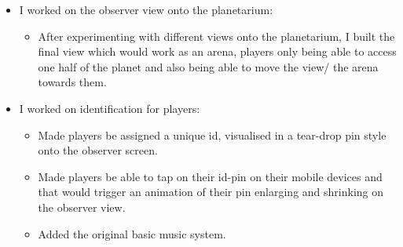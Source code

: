 \documentclass[11pt,a4paper]{article}
\begin{document}
\begin{itemize}
\begin{itemize}
          \end{itemize}
          \item I worked on the observer view onto the planetarium:
          \begin{itemize}
            \item After experimenting with different views onto the planetarium, I built the final view which would work as an arena, players only being able to access one half of the planet and also being able to move the view/ the arena towards them.
          \end{itemize}
          \item I worked on identification for players:
          \begin{itemize}
          \item Made players be assigned a unique id, visualised in a tear-drop pin style onto the observer screen.
          \item Made players be able to tap on their id-pin on their mobile devices and that would trigger an animation of their pin enlarging and shrinking on the observer view.
          \item Added the original basic music system.
          \end{itemize}
        \end{itemize}

        \pagebreak
\end{document}
